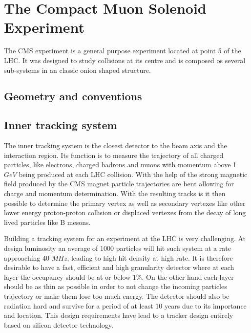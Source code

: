 \section{The Compact Muon Solenoid Experiment}
\label{SECTION:ExperimentalApparatus_CMS}

The \gls{CMS} experiment is a general purpose experiment located at point 5 of the \gls{LHC}. It was designed to study collisions at its centre and is composed os several sub-systems in an classic onion shaped structure.


\subsection{Geometry and conventions}


\subsection{Inner tracking system}
\label{SUBSECTION:ExperimentalApparatus_CMS_Tracker}

%

The inner tracking system is the closest detector to the beam axis and the interaction region. Its function is to measure the trajectory of all charged particles, like electrons, charged hadrons and muons with momentum above 1 $GeV$ being produced at each \gls{LHC} collision. With the help of the strong magnetic field produced by the \gls{CMS} magnet particle trajectories are bent allowing for charge and momentum determination. With the resulting tracks is it then possible to determine the primary vertex as well as secondary vertexes like other lower energy proton-proton collision or displaced vertexes from the decay of long lived particles like B mesons.

Building a tracking system for an experiment at the \gls{LHC} is very challenging. At design luminosity an average of 1000 particles will hit such system at a rate approaching 40 $MHz$, leading to high hit density at high rate. It is therefore desirable to have a fast, efficient and high granularity detector where at each layer the occupancy should be at or below $1\%$. On the other hand each layer should be as thin as possible in order to not change the incoming particles trajectory or make them lose too much energy. The detector should also be radiation hard and survive for a period of at least 10 years due to its importance and location. This design requirements have lead to a tracker design entirely based on silicon detector technology. 

